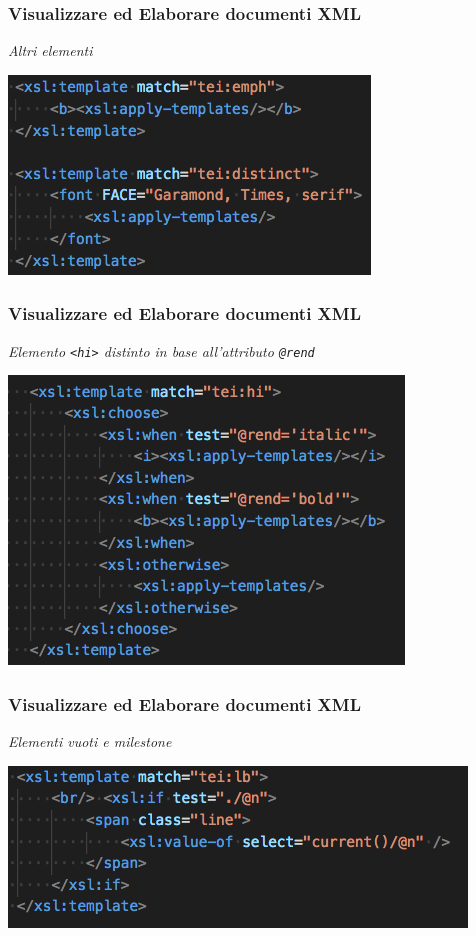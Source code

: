 \begin{frame}
    \frametitle{Visualizzare ed Elaborare documenti XML}
    \addtocounter{nframe}{1}
    
        \textit{Altri elementi}

    \begin{center}
        \includegraphics[width=.8\textwidth]{imgs/EsempioCommentato9.png}
    \end{center}

\end{frame}

\begin{frame}
    \frametitle{Visualizzare ed Elaborare documenti XML}
    \addtocounter{nframe}{1}
    
        \textit{Elemento \texttt{<hi>} distinto in base all'attributo \texttt{@rend}}

    \begin{center}
        \includegraphics[width=.85\textwidth]{imgs/EsempioCommentato10.png}
    \end{center}

\end{frame}

\begin{frame}
    \frametitle{Visualizzare ed Elaborare documenti XML}
    \addtocounter{nframe}{1}
    
        \textit{Elementi vuoti e milestone}

    \begin{center}
        \includegraphics[width=.9\textwidth]{imgs/EsempioCommentato11.png}
    \end{center}

\end{frame}




